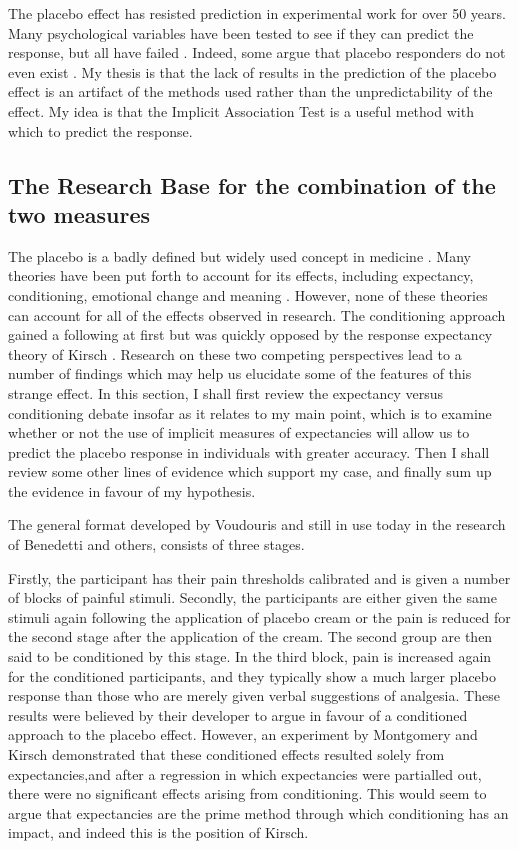 The placebo effect has resisted prediction in experimental work for over 50 years. Many psychological variables have been tested to see if they can predict the response, but all have failed \cite{Shapiro1997}. Indeed, some argue that placebo responders do not even exist \cite{Kaptchuk2008a}. My thesis is that the lack of results in the prediction of the placebo effect is an artifact of the methods used rather than the unpredictability of the effect. My idea is that the Implicit Association Test is a useful method with which to predict the response. 


\subsection{The Research Base for the combination of the two measures}
\label{sec:rese-base-comb}
The placebo is a badly defined but widely used concept in medicine \cite{Kaptchuk1998} . Many theories have been put forth to account for its effects, including expectancy, conditioning, emotional change and meaning \cite{Stewart-Williams2004b}. However, none of these theories can account for all of the effects observed in research. The conditioning approach gained a following at first \cite{Voudouris1985}  but was quickly opposed by the response expectancy theory of Kirsch \cite{Kirsch1985,Kirsch1997}. Research on these two competing perspectives lead to a number of findings which may help us elucidate some of the features of this strange effect. In this section, I shall first review the expectancy versus conditioning debate insofar as it relates to my main point, which is to examine whether or not the use of implicit measures of expectancies will allow us to predict the placebo response in individuals with greater accuracy. Then I shall review some other lines of evidence which support my case, and finally sum up the evidence in favour of my hypothesis.

The general format developed by Voudouris and still in use today in the research of Benedetti \cite{Benedetti2006c} and others, consists of three stages. 

Firstly, the participant has their pain thresholds calibrated and is given a number of blocks of painful stimuli. Secondly, the participants are either given the same stimuli again following the application of placebo cream or the pain is reduced for the second stage after the application of the cream. The second group are then said to be conditioned by this stage. In the third block, pain is increased again for the conditioned participants, and they typically show a much larger placebo response than those who are merely given verbal suggestions of analgesia.  These results were believed by their developer to argue in favour of a conditioned approach to the placebo effect. However, an experiment by Montgomery and Kirsch \cite{Montgomery1997} demonstrated that these conditioned effects resulted solely from expectancies,and after a regression in which expectancies were partialled out, there were no significant effects arising from conditioning. This would seem to argue that expectancies are the prime method through which conditioning has an impact, and indeed this is the position of Kirsch. 

